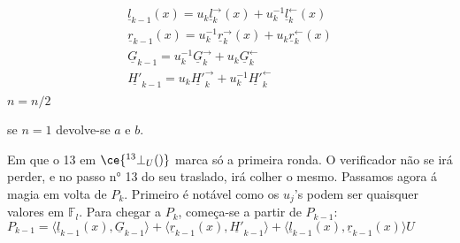 \begin{align*}
\underline{l}_{k-1}(x) = u_{k} \underline{l}_{k}^{\rightarrow}(x) + u^{-1}_{k} \underline{l}_{k}^{\leftarrow}(x)\\
\underline{r}_{k-1}(x) = u^{-1}_{k} \underline{r}_{k}^{\rightarrow}(x) + u_{k} \underline{r}_{k}^{\leftarrow}(x)\\
\underline{G}_{k-1} = u^{-1}_{k} \underline{G}_{k}^{\rightarrow} + u_{k} \underline{G}_{k}^{\leftarrow}\\
\underline{H'}_{k-1} = u_{k} \underline{H'}_{k}^{\rightarrow} + u^{-1}_{k} \underline{H'}_{k}^{\leftarrow}\\
\end{align*}
$n=n/2$

se $n=1$ devolve-se $a$ e $b$.

Em que o 13 em $\ce{^{13}_{\ }\bot_U()}$ marca só a primeira ronda. O verificador não se irá perder, e no passo n° 13 do seu traslado, irá colher o mesmo. Passamos agora á magia em volta de $P_k$. Primeiro é notável como os $u_{j}$'s podem ser quaisquer valores em $\mathbb{F}_l$. Para chegar a $P_k$, começa-se a partir de  $P_{k-1}$:\newline  
$
P_{k-1} = \langle \underline{l}_{k-1}(x),\underline{G}_{k-1}\rangle + \langle \underline{r}_{k-1}(x),\underline{H'}_{k-1}\rangle + \langle \underline{l}_{k-1}(x), \underline{r}_{k-1}(x)\rangle U
$

